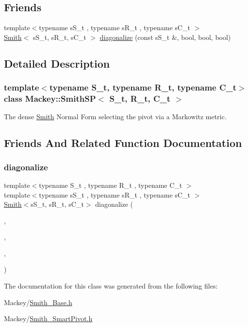 \subsection*{Friends}
\begin{DoxyCompactItemize}
\item 
{\footnotesize template$<$typename s\+S\+\_\+t , typename s\+R\+\_\+t , typename s\+C\+\_\+t $>$ }\\\hyperlink{classMackey_1_1Smith}{Smith}$<$ s\+S\+\_\+t, s\+R\+\_\+t, s\+C\+\_\+t $>$ \hyperlink{classMackey_1_1SmithSP_a020186c97759855bd063eeaaf0a17351}{diagonalize} (const s\+S\+\_\+t \&, bool, bool, bool)
\end{DoxyCompactItemize}


\subsection{Detailed Description}
\subsubsection*{template$<$typename S\+\_\+t, typename R\+\_\+t, typename C\+\_\+t$>$\newline
class Mackey\+::\+Smith\+S\+P$<$ S\+\_\+t, R\+\_\+t, C\+\_\+t $>$}

The dense \hyperlink{classMackey_1_1Smith}{Smith} Normal Form selecting the pivot via a Markowitz metric. 

\subsection{Friends And Related Function Documentation}
\mbox{\label{classMackey_1_1SmithSP_a020186c97759855bd063eeaaf0a17351}} 
\subsubsection{\texorpdfstring{diagonalize}{diagonalize}}
{\footnotesize\ttfamily template$<$typename S\+\_\+t , typename R\+\_\+t , typename C\+\_\+t $>$ \\
template$<$typename s\+S\+\_\+t , typename s\+R\+\_\+t , typename s\+C\+\_\+t $>$ \\
\hyperlink{classMackey_1_1Smith}{Smith}$<$s\+S\+\_\+t, s\+R\+\_\+t, s\+C\+\_\+t$>$ diagonalize (\begin{DoxyParamCaption}\item[{const s\+S\+\_\+t \&}]{,  }\item[{bool}]{,  }\item[{bool}]{,  }\item[{bool}]{ }\end{DoxyParamCaption})\hspace{0.3cm}{\ttfamily [friend]}}



The documentation for this class was generated from the following files\+:\begin{DoxyCompactItemize}
\item 
Mackey/\hyperlink{Smith__Base_8h}{Smith\+\_\+\+Base.\+h}\item 
Mackey/\hyperlink{Smith__SmartPivot_8h}{Smith\+\_\+\+Smart\+Pivot.\+h}\end{DoxyCompactItemize}
